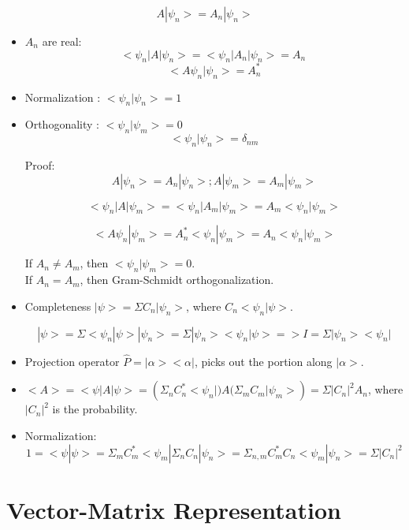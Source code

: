 \documentclass[12pt,a4paper]{article}
\begin{document}
\[
A | \psi _n > = A_n | \psi _n>
\]

\begin{itemize}

\item $A_n$ are real:
\[
< \psi _n |A| \psi _n > = < \psi _n | A_n | \psi _n > = A_n\
\]
\[
< A \psi _n | \psi _n > = A_n ^{*}
\]

\item Normalization : $ < \psi _n | \psi _n > =1$

\item Orthogonality : $ < \psi _n | \psi _m > =0$
\[
< \psi _n | \psi _n > = \delta _{nm}
\]

Proof:
\[
A | \psi _n >= A_n | \psi _n >; A| \psi _m >=A _m | \psi _m >
\]

\[
< \psi _n |A| \psi _m > = < \psi _n |A_m| \psi _m > = A_m <\psi _n | \psi _m>
\]

\[
< A \psi _n| \psi _m > = A_n ^{*} < \psi _n | \psi _m > = A_n <\psi _n | \psi _m >
\]

If $A_n \neq A_m$, then $< \psi _n | \psi _m > = 0$.\\
If $A_n = A_m$, then Gram-Schmidt orthogonalization.

\item Completeness $ | \psi > = \Sigma C_n | \psi _n >$, where $C_n < \psi _n | \psi >$.

\[
| \psi > = \Sigma < \psi _n | \psi > | \psi _n > = \Sigma | \psi _n > < \psi _n | \psi > => I= \Sigma | \psi _n > <\psi _n |
\]

\item Projection operator $\hat{P} = | \alpha > < \alpha |$, picks out the portion along $ | \alpha >$.

\item $<A>=< \psi |A| \psi >= ( \Sigma _n C_n ^{*} < \psi _n | ) A ( \Sigma _m C_m | \psi _m >) = \Sigma |C_n|^2 A_n$, where $|C_n|^2$ is the probability.

\item  Normalization:
\[
1= < \psi | \psi > = \Sigma _m C_m ^{*} < \psi _m |  \Sigma _n C_n | \psi _n > = \Sigma _{n,m} C_m ^* C_n < \psi _m | \psi _n > = \Sigma |C_n|^2
\]

\end{itemize}

\pagebreak

\section{Vector-Matrix Representation}
\end{document}
